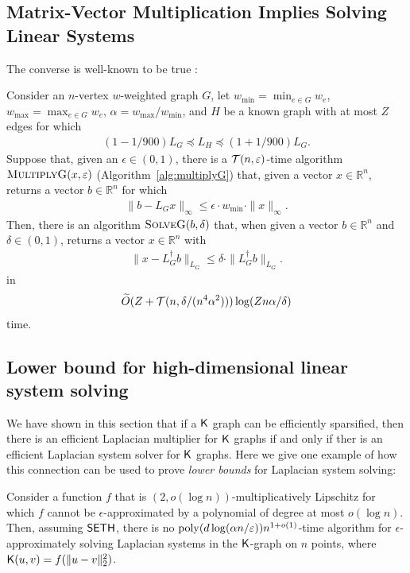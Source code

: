 \subsection{Matrix-Vector Multiplication Implies Solving Linear Systems}

The converse is well-known to be true \cite{st04,kmp11}:

\begin{lemma}[\cite{st04}]\label{lem:solve-given-mul} 
Consider an $n$-vertex $w$-weighted graph $G$, let $w_{\min} = \min_{e\in G} w_e $, $w_{\max} = \max_{e\in G} w_e$, $\alpha =  w_{\max} / w_{\min}$, and $H$ be a known graph with at most $Z$ edges for which \begin{align*}
    (1 - 1/900)L_G
    \preceq 
    L_H
    \preceq 
    (1 + 1/900)L_G.
\end{align*} 
Suppose that, given an $\epsilon \in (0,1)$, there is a $ \T(n,\epsilon)$-time algorithm $\textsc{MultiplyG}(x,\epsilon)$ (Algorithm~\ref{alg:multiplyG}) that, given a vector $x\in \mathbb{R}^n$, returns a vector $b\in \mathbb{R}^n$ for which
\begin{align*}
\|b - L_G x\|_{\infty}\le \epsilon \cdot w_{\min} \cdot \|x\|_{\infty}.
\end{align*} Then, there is an algorithm $\textsc{SolveG}(b,\delta)$  that, when given a vector $b\in \mathbb{R}^n$ and $\delta\in (0,1)$, returns a vector $x\in \mathbb{R}^n$ with
\begin{align*}
\|x - L_G^{\dag} b\|_{L_G}\le \delta \cdot \|L_G^{\dag}b\|_{L_G}.
\end{align*}
in 
\begin{align*}
\tilde{O}( Z + \T(n, \delta / ( n^4 \alpha^2 ) ) ) \log(Zn\alpha/\delta)
\end{align*}
time.
\end{lemma}

\subsection{Lower bound for high-dimensional linear system solving}

We have shown in this section that if a $\k$ graph can be efficiently sparsified, then there is an efficient Laplacian multiplier for $\k$ graphs if and only if ther is an efficient Laplacian system solver for $\k$ graphs. Here we give one example of how this connection can be used to prove \emph{lower bounds} for Laplacian system solving:

\begin{corollary}
Consider a function $f$ that is $(2,o(\log n))$-multiplicatively Lipschitz for which $f$ cannot be $\epsilon$-approximated by a polynomial of degree at most $o(\log n)$. Then, assuming $\SETH$, there is no $\poly(d\log(\alpha n/\epsilon))n^{1+o(1)}$-time algorithm for $\epsilon$-approximately solving Laplacian systems in the $\k$-graph on $n$ points, where $\k(u,v) = f(\|u-v\|_2^2)$.
\end{corollary}


